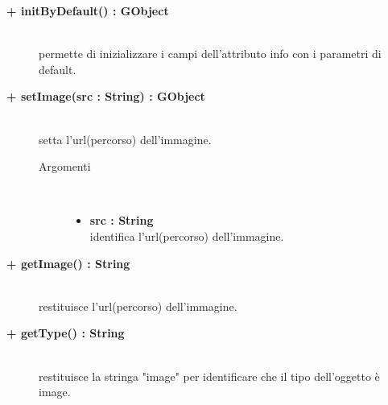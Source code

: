 \begin{description}
\begin{description}
\end{description}

\begin{description}
		\item[\textbf{\color{blue}+ initByDefault() : GObject			}] \hfill \\
			permette di inizializzare i campi dell'attributo info con i parametri di default. 

\end{description}

\begin{description}
		\item[\textbf{\color{blue}+ setImage(src : String) : GObject			}] \hfill \\
			setta l'url(percorso) dell'immagine. 
			
		\begin{description}
			\item[Argomenti] \hfill \\
				\begin{itemize}
				
					\item \textbf{src : String			} \hfill \\
					identifica l'url(percorso) dell'immagine.
				\end{itemize}
		\end{description}

\end{description}

\begin{description}
		\item[\textbf{\color{blue}+ getImage() : String			}] \hfill \\
			restituisce l'url(percorso) dell'immagine. 

\end{description}

\begin{description}
		\item[\textbf{\color{blue}+ getType() : String			}] \hfill \\
			restituisce la stringa "image" per identificare che il tipo dell'oggetto è image. 

\end{description}



\end{description}


